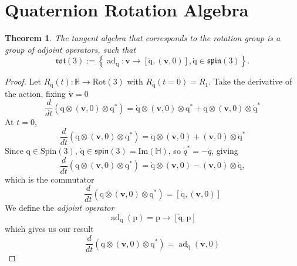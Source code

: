 \documentclass{amsart}
\DeclareMathOperator{\ad}{ad}
\newtheorem{theorem}{Theorem}[section]
\theoremstyle{definition}
\theoremstyle{remark}
\numberwithin{equation}{section}
\begin{document}
\section{Quaternion Rotation Algebra}
\begin{theorem}
  The tangent algebra that corresponds to the rotation group is a group of adjoint operators, such that
  \begin{equation}
    \mathfrak{rot}(3) := \left\{\ad_{\mathrm{\dot{q}}}: \mathbf{v} \to [\mathrm{\dot{q}}, (\mathbf{v}, 0)], \mathrm{\dot{q}}\in\mathfrak{spin}(3)\right\}.
  \end{equation}
\end{theorem}
\begin{proof}
  Let $R_\mathrm{q}(t): \mathbb{R} \to \mathrm{Rot}(3)$ with $R_\mathrm{q}(t=0)=R_\mathrm{1}$.
  Take the derivative of the action, fixing $\dot{\mathbf{v}}=0$
  \begin{equation}
    \frac{d}{dt} (\mathrm{q} \otimes (\mathbf{v}, 0) \otimes \mathrm{q}^*) = \mathrm{\dot{q}}\otimes (\mathbf{v}, 0) \otimes \mathrm{q}^* + \mathrm{q} \otimes (\mathbf{v}, 0) \otimes \mathrm{\dot{q}}^* \nonumber
  \end{equation}
  At $t=0$,
  \begin{equation}
    \frac{d}{dt} (\mathrm{q} \otimes (\mathbf{v}, 0) \otimes \mathrm{q}^*) = \mathrm{\dot{q}}\otimes (\mathbf{v}, 0) + (\mathbf{v}, 0) \otimes \mathrm{\dot{q}}^*\nonumber
  \end{equation}
  Since $\mathrm{q}\in\mathrm{Spin}(3)$, $\mathrm{\dot{q}}\in\mathfrak{spin}(3)=\mathrm{Im}(\mathbb{H})$, so $\dot{q}^*=-\dot{q}$, giving
  \begin{equation}
    \frac{d}{dt} (\mathrm{q} \otimes (\mathbf{v}, 0) \otimes \mathrm{q}^*) = \mathrm{\dot{q}}\otimes (\mathbf{v}, 0) - (\mathbf{v}, 0) \otimes \mathrm{\dot{q}}, \nonumber
  \end{equation}
  which is the commutator
  \begin{equation}
    \frac{d}{dt} (\mathrm{q} \otimes (\mathbf{v}, 0) \otimes \mathrm{q}^*) = [\mathrm{\dot{q}}, (\mathbf{v}, 0)] \nonumber
  \end{equation}
  We define the \emph{adjoint operator}
  \begin{equation}
    \ad_\mathrm{\dot{q}}(\mathrm{p}) = \mathrm{p} \to [\mathrm{\dot{q}}, \mathrm{p}] \nonumber
  \end{equation}
  which gives us our result
  \begin{equation}
    \frac{d}{dt} (\mathrm{q} \otimes (\mathbf{v}, 0) \otimes \mathrm{q}^*) = \ad_\mathrm{\dot{q}}(\mathbf{v}, 0) \nonumber
  \end{equation}
\end{proof}
\end{document}
